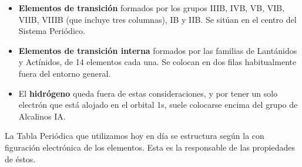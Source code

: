 \documentclass[12pt]{article}
\begin{document}
                    
                    \begin{itemize}
                         \item \textbf{Elementos de transición} formados por los grupos IIIB, IVB, VB, VIB, VIIB, VIIIB (que incluye tres columnas), IB y IIB. Se sitúan en el centro del Sistema Periódico.
                         \item \textbf{Elementos de transición interna} formados por las familias de Lantánidos y Actínidos, de 14 elementos cada una. Se colocan en dos filas habitualmente fuera del entorno general.
                         \item El \textbf{hidrógeno} queda fuera de estas consideraciones, y por tener un solo electrón que está alojado en el orbital 1s, suele colocarse encima del grupo de Alcalinos IA.
                    \end{itemize}

                    La Tabla Periódica que utilizamos hoy en día se estructura según la con figuración electrónica de los elementos. Esta es la responsable de las propiedades de éstos.
\end{document}

